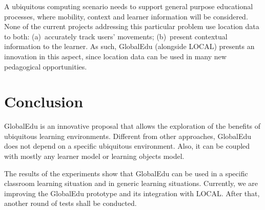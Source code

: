 \documentclass[5p,authoryear]{elsarticle}
\begin{document}
A ubiquitous computing scenario needs to support general purpose educational
processes, where mobility, context and learner information will be considered.
None of the current projects \citep{rogers05,ogata03} addressing this
particular problem use location data to both: (a)~accurately track users'
movements; (b)~present contextual information to the learner. As such,
GlobalEdu (alongside LOCAL) presents an innovation in this aspect, since
location data can be used in many new pedagogical opportunities.


%
%
\section{Conclusion} \label{sec:conclusion}

GlobalEdu is an innovative proposal that allows the exploration of the benefits
of ubiquitous learning environments. Different from other approaches, GlobalEdu
does not depend on a specific ubiquitous environment. Also, it can be coupled
with mostly any learner model or learning objects model. 

The results of the experiments show that GlobalEdu can be used in a specific
classroom learning situation and in generic learning situations. Currently, we
are improving the GlobalEdu prototype and its integration with LOCAL. After
that, another round of tests shall be conducted.

%
%
 

\end{document}
